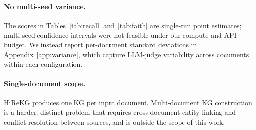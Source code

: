 \documentclass[11pt]{article}
\begin{document}
\paragraph{No multi-seed variance.} The scores in Tables~\ref{tab:recall} and~\ref{tab:faith} are single-run point estimates; multi-seed confidence intervals were not feasible under our compute and API budget. We instead report per-document standard deviations in Appendix~\ref{app:variance}, which capture LLM-judge variability across documents within each configuration.

\paragraph{Single-document scope.} HiReKG produces one KG per input document. Multi-document KG construction is a harder, distinct problem that requires cross-document entity linking and conflict resolution between sources, and is outside the scope of this work.




\end{document}
